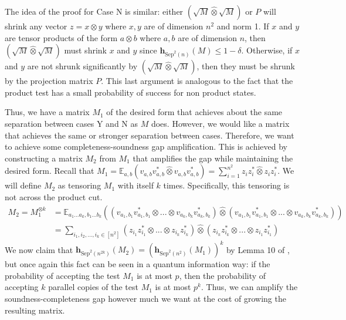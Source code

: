 \documentclass[10pt]{article}
\newcommand{\Sep}{\textrm{Sep}}
\newcommand{\mbf}[1]{\mathbf{ #1 }}
\begin{document}
The idea of the proof for Case N is similar: either $(\sqrt{M} \hat{\otimes} \sqrt{M})$ or $P$ will shrink any vector $z = x \otimes y$ where $x,y$ are of dimension $n^2$ and norm 1. If $x$ and $y$ are tensor products of the form $a \otimes b$ where $a,b$ are of dimension $n$, then $(\sqrt{M} \hat{\otimes} \sqrt{M})$ must shrink $x$ and $y$ since $\mbf{h}_{\Sep^2(n)}(M) \leq 1 - \delta$. Otherwise, if $x$ and $y$ are not shrunk significantly by $(\sqrt{M} \hat{\otimes} \sqrt{M})$, then they must be shrunk by the projection matrix $P$. This last argument is analogous to the fact that the product test has a small probability of success for non product states.

Thus, we have a matrix $M_1$ of the desired form that achieves about the same separation between cases Y and N as $M$ does. However, we would like a matrix that achieves the same or stronger separation between cases. Therefore, we want to achieve some completeness-soundness gap amplification. This is achieved by constructing a matrix $M_2$ from $M_1$ that amplifies the gap while maintaining the desired form. Recall that $M_1 = \mathbb{E}_{a,b}(v_{a,b} v_{a,b}^* \hat{\otimes} v_{a,b} v_{a,b}^*) = \sum_{i=1}^{n^2} z_iz_i^* \hat{\otimes} z_iz_i^*$. We will define $M_2$ as tensoring $M_1$ with itself $k$ times. Specifically, this tensoring is not across the product cut.
\begin{align*}
    M_2 = M_1^{\otimes k}
    &= \mathbb{E}_{a_1...a_k,b_1...b_k}
        ((v_{a_1,b_1} v_{a_1,b_1}^* \otimes ... \otimes v_{a_k,b_k} v_{a_k,b_k}^* ) 
        \hat{\otimes} 
        (v_{a_1,b_1} v_{a_1,b_1}^* \otimes ... \otimes v_{a_k,b_k} v_{a_k,b_k}^* )) \\
&= \sum_{i_1, i_2, \dots, i_k \in [n^2]} (z_{i_1} z_{i_1}^* \otimes ... \otimes z_{i_k}z_{i_k}^*) \hat{\otimes} (z_{i_k}z_{i_k}^* \otimes ... \otimes z_{i_1} z_{i_1}^*)
\end{align*}
We now claim that $\mbf{h}_{\Sep^2(n^{2k})}(M_2) = (\mbf{h}_{\Sep^2(n^{2})}(M_1))^k$ by Lemma 10 of \cite{hm10}, but once again this fact can be seen in a quantum information way: if the probability of accepting the test $M_1$ is at most $p$, then the probability of accepting $k$ parallel copies of the test $M_1$ is at most $p^k$. Thus, we can amplify the soundness-completeness gap however much we want at the cost of growing the resulting matrix.
\end{document}
